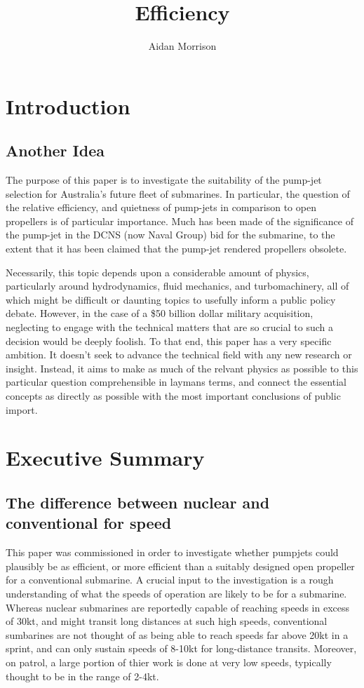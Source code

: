 \documentclass{article}\usepackage[]{graphicx}\usepackage[]{color}
\title{Efficiency}
\author{Aidan Morrison}
\begin{document}
\maketitle




\section{Introduction}

\subsection{Another Idea}

The purpose of this paper is to investigate the suitability of the pump-jet selection for Australia's future fleet of submarines.  In particular, the question of the relative efficiency, and quietness of pump-jets in comparison to open propellers is of particular importance.  Much has been made of the significance of the pump-jet in the DCNS (now Naval Group) bid for the submarine, to the extent that it has been claimed that the pump-jet rendered propellers obsolete.

Necessarily, this topic depends upon a considerable amount of physics, particularly around hydrodynamics, fluid mechanics, and turbomachinery, all of which might be difficult or daunting topics to usefully inform a public policy debate. However, in the case of a \$50 billion dollar military acquisition, neglecting to engage with the technical matters that are so crucial to such a decision would be deeply foolish.  To that end, this paper has a very specific ambition.  It doesn't seek to advance the technical field with any new research or insight.  Instead, it aims to make as much of the relvant physics as possible to this particular question comprehensible in laymans terms, and connect the essential concepts as directly as possible with the most important conclusions of public import.


\section{Executive Summary}

\subsection{The difference between nuclear and conventional for speed}

This paper was commissioned in order to investigate whether pumpjets could plausibly be as efficient, or more efficient than a suitably designed open propeller for a conventional submarine. A crucial input to the investigation is a rough understanding of what the speeds of operation are likely to be for a submarine.  Whereas nuclear submarines are reportedly capable of reaching speeds in excess of 30kt, and might transit long distances at such high speeds, conventional sumbarines are not thought of as being able to reach speeds far above 20kt in a sprint, and can only sustain speeds of 8-10kt for long-distance transits.  Moreover, on patrol, a large portion of thier work is done at very low speeds, typically thought to be in the range of 2-4kt. 
\end{document}
